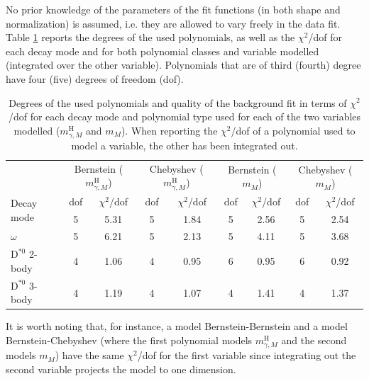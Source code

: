 No prior knowledge of the parameters of the fit functions (in both shape and normalization) is assumed, i.e. they are allowed to vary freely in the data fit. Table \ref{tab:bkg_polynomials} reports the degrees of the used polynomials, as well as the $\chi^2$/dof for each decay mode and for both polynomial classes and variable modelled (integrated over the other variable). Polynomials that are of third (fourth) degree have four (five) degrees of freedom (dof).
\begin{table}[!ht]
    \centering
    \begin{tabular}{|l|cc|cc|cc|cc|}
        \hline
        \cellcolor{lightgray} & \multicolumn{2}{c|}{\cellcolor{lightgray}Bernstein ($m^{\text{H}}_{\gamma, M}$)} & \multicolumn{2}{c|}{\cellcolor{lightgray}Chebyshev ($m^{\text{H}}_{\gamma, M}$)}   & \multicolumn{2}{c|}{\cellcolor{lightgray}Bernstein ($m_{M}$)} & \multicolumn{2}{c|}{\cellcolor{lightgray}Chebyshev ($m_{M}$)} \\
        \multirow{2}{*}[15pt]{\cellcolor{lightgray}Decay mode} & \cellcolor{lightgray}dof & \cellcolor{lightgray}$\chi^2$/dof & \cellcolor{lightgray}dof & \cellcolor{lightgray}$\chi^2$/dof & \cellcolor{lightgray}dof & \cellcolor{lightgray}$\chi^2$/dof & \cellcolor{lightgray}dof & \cellcolor{lightgray}$\chi^2$/dof \\ \hline
        $\phi$                  &5&5.31   &5&1.84     &5&2.56   &5&2.54   \\
        $\omega$                &5&6.21   &5&2.13     &5&4.11   &5&3.68   \\
        $\text{D}^{*0}$ 2-body  &4&1.06   &4&0.95     &6&0.95   &6&0.92   \\
        $\text{D}^{*0}$ 3-body  &4&1.19   &4&1.07     &4&1.41   &4&1.37   \\
        \hline
        \end{tabular}
    \caption{Degrees of the used polynomials and quality of the background fit in terms of $\chi^2$/dof for each decay mode and polynomial type used for each of the two variables modelled ($m^{\text{H}}_{\gamma, M}$ and $m_{M}$). When reporting the $\chi^2$/dof of a polynomial used to model a variable, the other has been integrated out.}
    \label{tab:bkg_polynomials}
\end{table}
It is worth noting that, for instance, a model Bernstein-Bernstein and a model Bernstein-Chebyshev (where the first polynomial models $m^{\text{H}}_{\gamma, M}$ and the second models $m_{M}$) have the same $\chi^2$/dof for the first variable since integrating out the second variable projects the model to one dimension.

